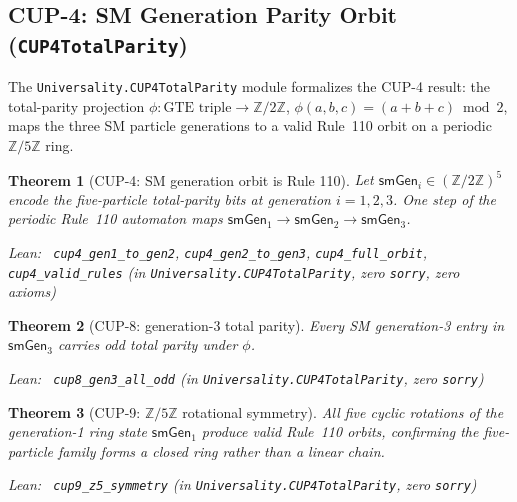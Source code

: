\documentclass[11pt,a4paper]{article}
\newenvironment{leanref}%
  {\par\smallskip\noindent\begingroup\raggedright\textup{Lean:}~}%
  {\par\endgroup}
\newtheorem{theorem}{Theorem}[section]
\theoremstyle{definition}
\begin{document}
\subsection{CUP-4: SM Generation Parity Orbit (\texttt{CUP4TotalParity})}\label{subsec:cup4-total-parity}

The \texttt{Universality.CUP4TotalParity} module formalizes the CUP-4 result: the
total-parity projection $\phi : \text{GTE triple} \to \mathbb{Z}/2\mathbb{Z}$,
$\phi(a,b,c) = (a+b+c)\bmod 2$, maps the three SM particle generations to a valid
Rule~110 orbit on a periodic $\mathbb{Z}/5\mathbb{Z}$ ring.

\begin{theorem}[CUP-4: SM generation orbit is Rule 110]\label{thm:cup4}
Let $\mathsf{smGen}_i \in (\mathbb{Z}/2\mathbb{Z})^5$ encode the five-particle total-parity
bits at generation $i = 1,2,3$.  One step of the periodic Rule~110 automaton maps
$\mathsf{smGen}_1 \to \mathsf{smGen}_2 \to \mathsf{smGen}_3$.

\begin{leanref}
\lstinline|cup4_gen1_to_gen2|, \lstinline|cup4_gen2_to_gen3|,
\lstinline|cup4_full_orbit|, \lstinline|cup4_valid_rules|
\textup{(in \texttt{Universality.CUP4TotalParity}, zero \texttt{sorry}, zero axioms)}
\end{leanref}
\end{theorem}

\begin{theorem}[CUP-8: generation-3 total parity]\label{thm:cup8}
Every SM generation-3 entry in $\mathsf{smGen}_3$ carries odd total parity under $\phi$.

\begin{leanref}
\lstinline|cup8_gen3_all_odd|
\textup{(in \texttt{Universality.CUP4TotalParity}, zero \texttt{sorry})}
\end{leanref}
\end{theorem}

\begin{theorem}[CUP-9: $\mathbb{Z}/5\mathbb{Z}$ rotational symmetry]\label{thm:cup9}
All five cyclic rotations of the generation-1 ring state $\mathsf{smGen}_1$ produce
valid Rule~110 orbits, confirming the five-particle family forms a closed ring rather
than a linear chain.

\begin{leanref}
\lstinline|cup9_z5_symmetry|
\textup{(in \texttt{Universality.CUP4TotalParity}, zero \texttt{sorry})}
\end{leanref}
\end{theorem}
\end{document}
